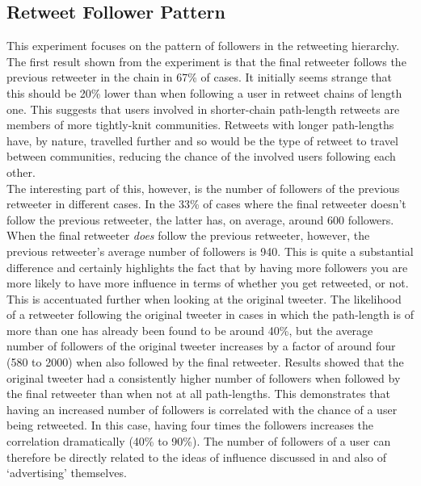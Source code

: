 \subsection{Retweet Follower Pattern}
\label{retweet follower pattern}
This experiment focuses on the pattern of followers in the retweeting hierarchy.\\
The first result shown from the experiment is that the final retweeter follows the previous retweeter in the chain in 67\% of cases. It initially seems strange that this should be 20\% lower than when following a user in retweet chains of length one. This suggests that users involved in shorter-chain path-length retweets are members of more tightly-knit communities. Retweets with longer path-lengths have, by nature, travelled further and so would be the type of retweet to travel between communities, reducing the chance of the involved users following each other.\\
The interesting part of this, however, is the number of followers of the previous retweeter in different cases. In the 33\% of cases where the final retweeter doesn't follow the previous retweeter, the latter has, on average, around 600 followers. When the final retweeter \textit{does} follow the previous retweeter, however, the previous retweeter's average number of followers is 940. This is quite a substantial difference and certainly highlights the fact that by having more followers you are more likely to have more influence in terms of whether you get retweeted, or not.\\
This is accentuated further when looking at the original tweeter. The likelihood of a retweeter following the original tweeter in cases in which the path-length is of more than one has already been found to be around 40\%, but the average number of followers of the original tweeter increases by a factor of around four (580 to 2000) when also followed by the final retweeter. Results showed that the original tweeter had a consistently higher number of followers when followed by the final retweeter than when not at all path-lengths. This demonstrates that having an increased number of followers is correlated with the chance of a user being retweeted. In this case, having four times the followers increases the correlation dramatically (40\% to 90\%). The number of followers of a user can therefore be directly related to the ideas of influence discussed in \cite{cha10} and also of `advertising' themselves.\\
